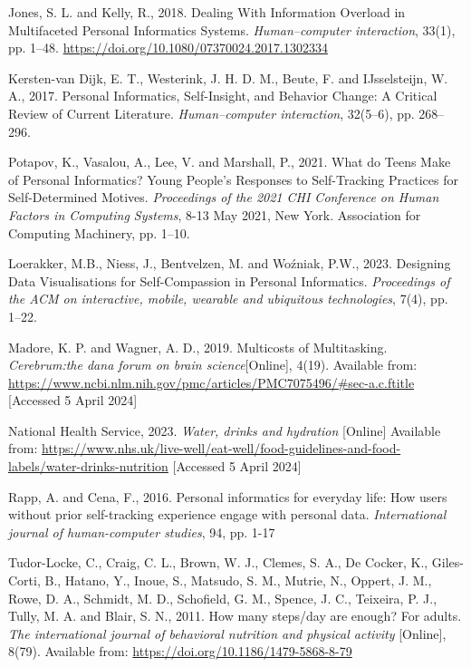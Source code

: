 \documentclass[11pt]{article}
\begin{document}
\renewcommand{\refname}{} 
\vspace{-20pt}
\begin{thebibliography}{99}
    Jones, S. L. and Kelly, R., 2018. 
    Dealing With Information Overload in Multifaceted Personal Informatics Systems. 
    \textit{Human–computer interaction}, 33(1), pp. 1–48. \url{https://doi.org/10.1080/07370024.2017.1302334}

    Kersten-van Dijk, E. T., Westerink, J. H. D. M., Beute, F. and 
    IJsselsteijn, W. A., 2017. 
    Personal Informatics, Self-Insight, and Behavior Change: A Critical Review of Current Literature. 
    \textit{Human–computer interaction}, 32(5–6), pp. 268–296.

    Potapov, K., Vasalou, A., Lee, V. and Marshall, P., 2021. 
    What do Teens Make of Personal Informatics? 
    Young People's Responses to Self-Tracking Practices for Self-Determined Motives. 
    \textit{Proceedings of the 2021 CHI Conference on Human Factors in Computing Systems}, 
    8-13 May 2021, New York. Association for Computing Machinery, pp. 1–10.

    Loerakker, M.B., Niess, J., Bentvelzen, M. and Woźniak, P.W., 2023. 
    Designing Data Visualisations for Self-Compassion in Personal Informatics. 
    \textit{Proceedings of the ACM on interactive, mobile, wearable and ubiquitous technologies}, 7(4), pp. 1–22.

    Madore, K. P. and Wagner, A. D., 2019. Multicosts of Multitasking. 
    \textit{Cerebrum:the dana forum on brain science}[Online], 4(19). Available from:
    \url{https://www.ncbi.nlm.nih.gov/pmc/articles/PMC7075496/#sec-a.c.ftitle} 
    [Accessed 5 April 2024]

    National Health Service, 2023. \textit{Water, drinks and hydration} [Online] 
    Available from: 
    \url{https://www.nhs.uk/live-well/eat-well/food-guidelines-and-food-labels/water-drinks-nutrition} 
    [Accessed 5 April 2024]
    
    Rapp, A. and Cena, F., 2016. Personal informatics for everyday life: 
    How users without prior self-tracking experience engage with personal data. 
    \textit{International journal of human-computer studies}, 94, pp. 1-17

    Tudor-Locke, C., Craig, C. L., Brown, W. J., Clemes, S. A., De Cocker, K., 
    Giles-Corti, B., Hatano, Y., Inoue, S., Matsudo, S. M., Mutrie, N., Oppert, J. M., Rowe, D. A., 
    Schmidt, M. D., Schofield, G. M., Spence, J. C., Teixeira, P. J., Tully, M. A. and Blair, S. N., 2011. 
    How many steps/day are enough? For adults. 
    \textit{The international journal of behavioral nutrition and physical activity} 
    [Online], 8(79). Available from: \url{https://doi.org/10.1186/1479-5868-8-79}


\end{thebibliography}
\end{document}

